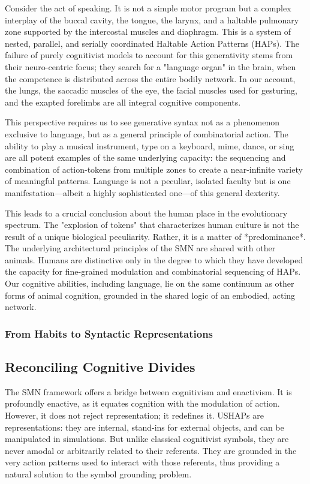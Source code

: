 Consider the act of speaking. It is not a simple motor program but a complex interplay of the buccal cavity, the tongue, the larynx, and a haltable pulmonary zone supported by the intercostal muscles and diaphragm. This is a system of nested, parallel, and serially coordinated Haltable Action Patterns (HAPs). The failure of purely cognitivist models to account for this generativity stems from their neuro-centric focus; they search for a "language organ" in the brain, when the competence is distributed across the entire bodily network. In our account, the lungs, the saccadic muscles of the eye, the facial muscles used for gesturing, and the exapted forelimbs are all integral cognitive components.

This perspective requires us to see generative syntax not as a phenomenon exclusive to language, but as a general principle of combinatorial action. The ability to play a musical instrument, type on a keyboard, mime, dance, or sing are all potent examples of the same underlying capacity: the sequencing and combination of action-tokens from multiple zones to create a near-infinite variety of meaningful patterns. Language is not a peculiar, isolated faculty but is one manifestation—albeit a highly sophisticated one—of this general dexterity.

This leads to a crucial conclusion about the human place in the evolutionary spectrum. The "explosion of tokens" that characterizes human culture is not the result of a unique biological peculiarity. Rather, it is a matter of *predominance*. The underlying architectural principles of the SMN are shared with other animals. Humans are distinctive only in the degree to which they have developed the capacity for fine-grained modulation and combinatorial sequencing of HAPs. Our cognitive abilities, including language, lie on the same continuum as other forms of animal cognition, grounded in the shared logic of an embodied, acting network.

\subsubsection*{From Habits to Syntactic Representations}

\subsection*{Reconciling Cognitive Divides}
The SMN framework offers a bridge between cognitivism and enactivism. It is profoundly enactive, as it equates cognition with the modulation of action. However, it does not reject representation; it redefines it. USHAPs are representations: they are internal, stand-ins for external objects, and can be manipulated in simulations. But unlike classical cognitivist symbols, they are never amodal or arbitrarily related to their referents. They are grounded in the very action patterns used to interact with those referents, thus providing a natural solution to the symbol grounding problem.

